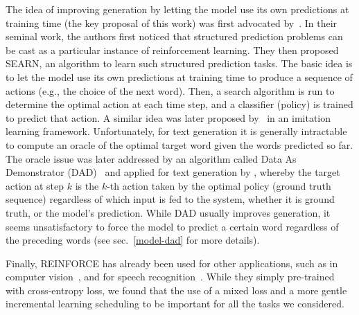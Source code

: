 The idea of improving generation by letting the model use its own predictions at training 
time (the key proposal of this work) was first advocated by~\citet{searn}. In their seminal 
work, the authors first noticed that structured prediction problems
can be cast as a particular instance of reinforcement learning. They then
proposed SEARN, an algorithm to learn such structured
prediction tasks. The basic idea is to let the model use its own
predictions at training time to produce a sequence of actions (e.g.,
the choice of the next word). Then, a search algorithm is
run to determine the optimal action at each time step, and a
classifier (\aka policy) is trained to predict that action. A similar idea was later
proposed by~\citet{dagger} in an imitation learning framework. 
Unfortunately, for text generation it is generally intractable to compute
an oracle of the optimal target word given the words predicted so far.
The oracle issue was later addressed by an algorithm called 
Data As Demonstrator (DAD)~\citep{dad} and applied for text generation by 
\cite{sbengio-nips2015}, whereby the target action at step $k$ is the
$k$-th action taken by the optimal policy (ground truth sequence) regardless of which
input is fed to the system, whether it is ground truth, or the model's
prediction. While DAD usually improves generation, it seems unsatisfactory to force 
the model to predict a certain word regardless of the preceding words 
(see sec.~\ref{model-dad} for more details). 

Finally, REINFORCE has already been used for other applications, such as in 
computer vision~\citep{vmnih-nips2014,xu-icml2015,ba_iclr15}, and for speech recognition~\cite{graves_icml14}. 
While they simply pre-trained with cross-entropy loss, we found that the use of a mixed loss and a more gentle incremental learning scheduling to be important for all the tasks we considered.
